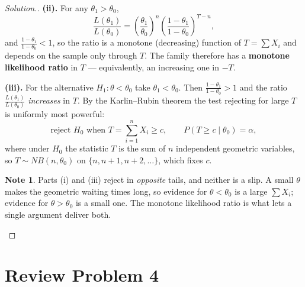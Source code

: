 \documentclass[12pt,a4paper]{report}
\theoremstyle{definition}
\newtheorem{note}[thm]{Note}
\theoremstyle{plain}
\newenvironment{solution}
  {\renewcommand{\qedsymbol}{}\begin{proof}[\textit{Solution}.]}
  {\end{proof}}
\begin{document}
\begin{solution}
\textbf{(ii).} For any $\theta_1>\theta_0$,
\[\frac{L(\theta_1)}{L(\theta_0)}
=\left(\frac{\theta_1}{\theta_0}\right)^n
\left(\frac{1-\theta_1}{1-\theta_0}\right)^{T-n},\]
and $\frac{1-\theta_1}{1-\theta_0}<1$, so the ratio is a monotone (decreasing)
function of $T=\sum X_i$ and depends on the sample only through $T$. The family
therefore has a \textbf{monotone likelihood ratio} in $T$ --- equivalently, an
increasing one in $-T$.

\textbf{(iii).} For the alternative $H_1:\theta<\theta_0$ take
$\theta_1<\theta_0$. Then $\frac{1-\theta_1}{1-\theta_0}>1$ and the ratio
$\frac{L(\theta_1)}{L(\theta_0)}$ \emph{increases} in $T$. By the Karlin--Rubin
theorem the test rejecting for large $T$ is uniformly most powerful:
\[\text{reject } H_0 \text{ when } T=\sum_{i=1}^nX_i\geq c,\qquad
P\left(T\geq c\mid\theta_0\right)=\alpha,\]
where under $H_0$ the statistic $T$ is the sum of $n$ independent geometric
variables, so $T\sim NB(n,\theta_0)$ on $\{n,n+1,n+2,\ldots\}$, which fixes $c$.

\begin{note}
Parts (i) and (iii) reject in \emph{opposite} tails, and neither is a slip. A
small $\theta$ makes the geometric waiting times long, so evidence for
$\theta<\theta_0$ is a large $\sum X_i$; evidence for $\theta>\theta_0$ is a
small one. The monotone likelihood ratio is what lets a single argument deliver
both.
\end{note}
\end{solution}

\section{Review Problem 4}
\end{document}
